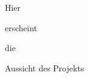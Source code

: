 \begin{frame}
\begin{block}{}
	Hier
\end{block}
\begin{block}{}
	erscheint
\end{block}
\begin{block}{}
	die
\end{block}
\begin{block}{}
	Aussicht des Projekts
\end{block}
\end{frame}